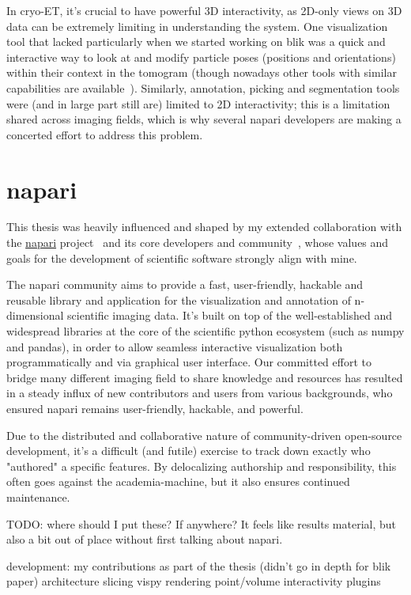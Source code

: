 In cryo-ET, it's crucial to have powerful 3D interactivity, as 2D-only views on 3D data can be extremely limiting in understanding the system.
One visualization tool that lacked particularly when we started working on blik was a quick and interactive way to look at and modify particle poses (positions and orientations) within their context in the tomogram (though nowadays other tools with similar capabilities are available~\cite{ermelArtiaXElectronTomography2022}).
Similarly, annotation, picking and segmentation tools were (and in large part still are) limited to 2D interactivity; this is a limitation shared across imaging fields, which is why several napari developers are making a concerted effort to address this problem.

\section{napari}

This thesis was heavily influenced and shaped by my extended collaboration with the \href{https://napari.org/}{napari} project~\cite{thenaparicommunityNapariMultidimensionalImage2024} and its core developers and community~\cite{thenaparicommunityCommunityNapari2024}, whose values and goals for the development of scientific software strongly align with mine.

The napari community aims to provide a fast, user-friendly, hackable and reusable library and application for the visualization and annotation of n-dimensional scientific imaging data.
It's built on top of the well-established and widespread libraries at the core of the scientific python ecosystem (such as numpy and pandas), in order to allow seamless interactive visualization both programmatically and via graphical user interface.
Our committed effort to bridge many different imaging field to share knowledge and resources has resulted in a steady influx of new contributors and users from various backgrounds, who ensured napari remains user-friendly, hackable, and powerful.

Due to the distributed and collaborative nature of community-driven open-source development, it's a difficult (and futile) exercise to track down exactly who "authored" a specific features.
By delocalizing authorship and responsibility, this often goes against the academia-machine, but it also ensures continued maintenance.

TODO: where should I put these? If anywhere? It feels like results material, but also a bit out of place without first talking about napari.
\begin{outline}
\1 development: my contributions as part of the thesis (didn't go in depth for blik paper)
    \2 architecture
    \2 slicing
    \2 vispy rendering
    \2 point/volume interactivity
    \2 plugins
\end{outline}

